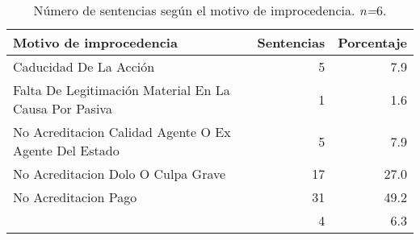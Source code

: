 \begin{table}[H]
\centering
\caption{Número de sentencias según el motivo de improcedencia. \textit{n=}6.} 
\label{tab:improcedencia}
\begin{tabular}{lrr}
  \hline
Motivo de improcedencia & Sentencias & Porcentaje \\ 
  \hline
Caducidad De La Acción &  5 & 7.9 \\ 
  Falta De Legitimación Material En La Causa Por Pasiva &  1 & 1.6 \\ 
  No Acreditacion Calidad Agente O Ex Agente Del Estado &  5 & 7.9 \\ 
  No Acreditacion Dolo O Culpa Grave & 17 & 27.0 \\ 
  No Acreditacion Pago & 31 & 49.2 \\ 
   &  4 & 6.3 \\ 
   \hline
\end{tabular}
\end{table}
